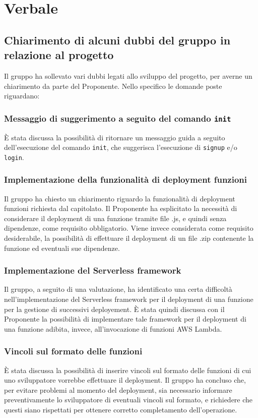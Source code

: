 \section{Verbale}
\subsection{Chiarimento di alcuni dubbi del gruppo in relazione al progetto}
Il gruppo ha sollevato vari dubbi legati allo sviluppo del progetto, per averne un chiarimento da parte del Proponente. Nello specifico le domande poste riguardano:
\subsubsection*{Messaggio di suggerimento a seguito del comando \texttt{init}}
È stata discussa la possibilità di ritornare un messaggio guida a seguito dell'esecuzione del comando \texttt{init}, che suggerisca l'esecuzione di \texttt{signup} e/o \texttt{login}.
\subsubsection*{Implementazione della funzionalità di deployment funzioni}
Il gruppo ha chiesto un chiarimento riguardo la funzionalità di deployment funzioni richiesta dal capitolato. Il Proponente ha esplicitato la necessità di considerare il deployment di una funzione tramite file .js, e quindi senza dipendenze, come requisito obbligatorio. Viene invece considerata come requisito desiderabile, la possibilità di effettuare il deployment di un file .zip contenente la funzione ed eventuali sue dipendenze.
\subsubsection*{Implementazione del Serverless framework}
Il gruppo, a seguito di una valutazione, ha identificato una certa difficoltà nell'implementazione del Serverless framework per il deployment di una funzione per la gestione di successivi deployement. È stata quindi discussa con il Proponente la possibilità di implementare tale framework per il deployment di una funzione adibita, invece, all'invocazione di funzioni AWS Lambda.
\subsubsection*{Vincoli sul formato delle funzioni}
È stata discussa la possibilità di inserire vincoli sul formato delle funzioni di cui uno sviluppatore vorrebbe effettuare il deployment. Il gruppo ha concluso che, per evitare problemi al momento del deployment, sia necessario informare preventivamente lo sviluppatore di eventuali vincoli sul formato, e richiedere che questi siano rispettati per ottenere corretto completamento dell'operazione.
